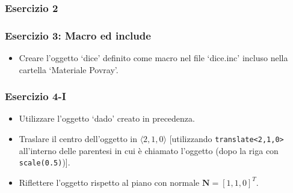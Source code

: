 \documentclass{beamer}
\newcommand{\fig}{figures}
\begin{document}
%
\begin{frame}
\frametitle{Esercizio 2}
\begin{center}
\end{center}
\end{frame}
\begin{frame}
\frametitle{Esercizio 3: Macro ed include}
\begin{itemize}
\item Creare l'oggetto `dice' definito come macro nel file `dice.inc' incluso nella cartella `Materiale Povray'. 
\end{itemize}
\end{frame}
\begin{frame}
\frametitle {Esercizio 4-I}
\begin{itemize}
\item Utilizzare l'oggetto `dado' creato in precedenza.
\item Traslare il centro dell'oggetto in   $\langle 2,1,0\rangle$ [utilizzando
\texttt{translate<2,1,0>} all'interno delle parentesi in cui \`e chiamato
l'oggetto (dopo la riga con \texttt{scale(0.5)})].  
\item Riflettere l'oggetto rispetto
al piano con normale $\textbf{N}=[1,1,0]^T$.
\end{itemize}
\end{frame}
\end{document}
